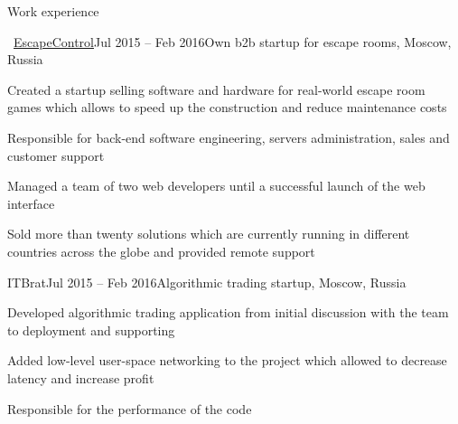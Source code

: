 \documentclass{resume} %
\begin{document}
\begin{rSection}{Work experience}
	
	\begin{rSubsection}{\faExternalLink~\href{http://escapecontrol.ru}{EscapeControl}}{Jul 2015 -- Feb 2016}{Own b2b startup for escape rooms, Moscow, Russia}{}
		\item Created a startup selling software and hardware for real-world escape room games which allows to speed up the construction and reduce maintenance costs
		\item Responsible for back-end software engineering, servers administration, sales and customer support
		\item Managed a team of two web developers until a successful launch of the web interface
		\item Sold more than twenty solutions which are currently running in different countries across the globe and provided remote support
	\end{rSubsection}
	
	\begin{rSubsection}{ITBrat}{Jul 2015 -- Feb 2016}{Algorithmic trading startup, Moscow, Russia}{}
		\item Developed algorithmic trading application from initial discussion with the team to deployment and supporting
		\item Added low-level user-space networking to the project which allowed to decrease latency and increase profit
		\item Responsible for the performance of the code
	\end{rSubsection}
	
	
\end{rSection}
\end{document}
